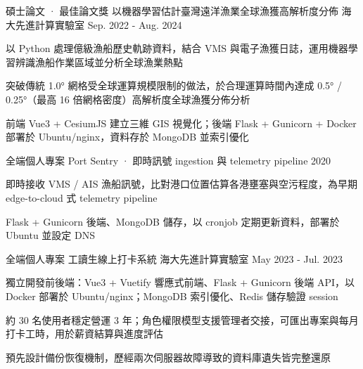 

\begin{cventries}

  \cventry
    {碩士論文 · 最佳論文獎} %
    {以機器學習估計臺灣遠洋漁業全球漁獲高解析度分佈} %
    {海大先進計算實驗室} %
    {Sep. 2022 - Aug. 2024} %
    {
      \begin{cvitems} %
        \item {以 Python 處理億級漁船歷史軌跡資料，結合 VMS 與電子漁獲日誌，運用機器學習辨識漁船作業區域並分析全球漁業熱點}
        \item {突破傳統 1.0° 網格受全球運算規模限制的做法，於合理運算時間內達成 0.5° / 0.25°（最高 16 倍網格密度）高解析度全球漁獲分佈分析}
        \item {前端 Vue3 + CesiumJS 建立三維 GIS 視覺化；後端 Flask + Gunicorn + Docker 部署於 Ubuntu/nginx，資料存於 MongoDB 並索引優化}
      \end{cvitems}
    }

  \cventry
    {全端個人專案} %
    {Port Sentry · 即時訊號 ingestion 與 telemetry pipeline} %
    {} %
    {2020} %
    {
      \begin{cvitems} %
        \item {即時接收 VMS / AIS 漁船訊號，比對港口位置估算各港壅塞與空污程度，為早期 edge-to-cloud 式 telemetry pipeline}
        \item {Flask + Gunicorn 後端、MongoDB 儲存，以 cronjob 定期更新資料，部署於 Ubuntu 並設定 DNS}
      \end{cvitems}
    }

  \cventry
    {全端個人專案} %
    {工讀生線上打卡系統} %
    {海大先進計算實驗室} %
    {May 2023 - Jul. 2023} %
    {
      \begin{cvitems} %
        \item {獨立開發前後端：Vue3 + Vuetify 響應式前端、Flask + Gunicorn 後端 API，以 Docker 部署於 Ubuntu/nginx；MongoDB 索引優化、Redis 儲存驗證 session}
        \item {約 30 名使用者穩定營運 3 年；角色權限模型支援管理者交接，可匯出專案與每月打卡工時，用於薪資結算與進度評估}
        \item {預先設計備份恢復機制，歷經兩次伺服器故障導致的資料庫遺失皆完整還原}
      \end{cvitems}
    }

\end{cventries}

\vspace{0.5mm}
\par

